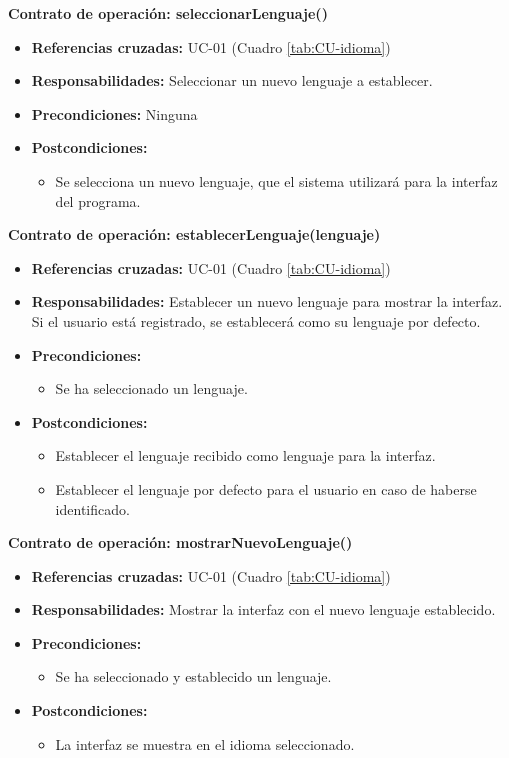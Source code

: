\textbf{Contrato de operación: seleccionarLenguaje()}
\begin{itemize}
\item \textbf{Referencias cruzadas:} UC-01 (Cuadro \ref{tab:CU-idioma})
\item \textbf{Responsabilidades:} Seleccionar un nuevo lenguaje a establecer.
\item \textbf{Precondiciones:} Ninguna
\item \textbf{Postcondiciones:}
 \begin{itemize}
\item Se selecciona un nuevo lenguaje, que el sistema utilizará para la interfaz del programa.
\end {itemize}
\end {itemize}

\textbf{Contrato de operación: establecerLenguaje(lenguaje)}
\begin{itemize}
\item \textbf{Referencias cruzadas:} UC-01 (Cuadro \ref{tab:CU-idioma})
\item \textbf{Responsabilidades:} Establecer un nuevo lenguaje para mostrar la interfaz. Si el usuario está registrado, se establecerá como su lenguaje por defecto.
\item \textbf{Precondiciones:} 
 \begin{itemize}
\item Se ha seleccionado un lenguaje.
\end {itemize}
\item \textbf{Postcondiciones:} 
 \begin{itemize}
\item Establecer el lenguaje recibido como lenguaje para la interfaz.
\item Establecer el lenguaje por defecto para el usuario en caso de haberse identificado.
\end {itemize}
\end {itemize}


\textbf{Contrato de operación: mostrarNuevoLenguaje()}
\begin{itemize}
\item \textbf{Referencias cruzadas:} UC-01 (Cuadro \ref{tab:CU-idioma})
\item \textbf{Responsabilidades:} Mostrar la interfaz con el nuevo lenguaje establecido.
\item \textbf{Precondiciones:} 
 \begin{itemize}
\item Se ha seleccionado y establecido un lenguaje.
\end {itemize}
\item \textbf{Postcondiciones:} 
 \begin{itemize}
\item La interfaz se muestra en el idioma seleccionado.
\end {itemize}
\end {itemize}

